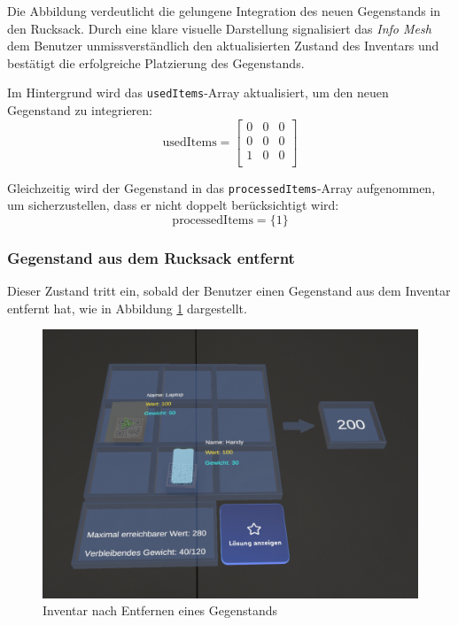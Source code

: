 \begin{itemize}
Die Abbildung verdeutlicht die gelungene Integration des neuen Gegenstands in den Rucksack. Durch eine klare visuelle
Darstellung signalisiert das \textit{Info Mesh} dem Benutzer unmissverständlich den aktualisierten Zustand des Inventars
und bestätigt die erfolgreiche Platzierung des Gegenstands.

Im Hintergrund wird das \texttt{usedItems}-Array aktualisiert, um den neuen Gegenstand zu integrieren:
\[
\text{usedItems} =
\left[
\begin{array}{ccccc}
0 & 0 & 0 \\
0 & 0 & 0 \\
1 & 0 & 0 \\
\end{array}
\right]
\]

Gleichzeitig wird der Gegenstand in das \texttt{processedItems}-Array aufgenommen, um sicherzustellen, dass er nicht
doppelt berücksichtigt wird:
\[
\text{processedItems} = \{1\}
\]

\subsubsection*{Gegenstand aus dem Rucksack entfernt}
Dieser Zustand tritt ein, sobald der Benutzer einen Gegenstand aus dem Inventar entfernt hat, wie in Abbildung
\ref{fig:controller_itemRemoved} dargestellt.

\begin{figure}[H]
    \centering
    \includegraphics[width=\textwidth]{images/itemEntfernt}
    \caption{Inventar nach Entfernen eines Gegenstands}
    \label{fig:controller_itemRemoved}
\end{figure}


\end{itemize}
